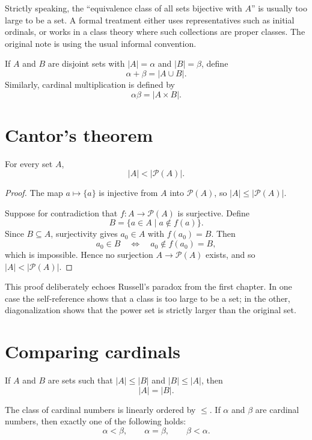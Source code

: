 \begin{caution}
Strictly speaking, the ``equivalence class of all sets bijective with \(A\)'' is usually too large to be a set.  A formal treatment either uses representatives such as initial ordinals, or works in a class theory where such collections are proper classes.  The original note is using the usual informal convention.
\end{caution}

If \(A\) and \(B\) are disjoint sets with \(|A|=\alpha\) and \(|B|=\beta\), define
\[
  \alpha+\beta=|A\cup B|.
\]
Similarly, cardinal multiplication is defined by
\[
  \alpha\beta=|A\times B|.
\]

\section{Cantor's theorem}

\begin{theorem}[Cantor]
For every set \(A\),
\[
  |A|<|\mathcal P(A)|.
\]
\end{theorem}

\begin{proof}
The map \(a\mapsto\{a\}\) is injective from \(A\) into \(\mathcal P(A)\), so \(|A|\le |\mathcal P(A)|\).

Suppose for contradiction that \(f:A\to\mathcal P(A)\) is surjective.  Define
\[
  B=\{a\in A\mid a\notin f(a)\}.
\]
Since \(B\subseteq A\), surjectivity gives \(a_0\in A\) with \(f(a_0)=B\).  Then
\[
  a_0\in B \quad\Longleftrightarrow\quad a_0\notin f(a_0)=B,
\]
which is impossible.  Hence no surjection \(A\to\mathcal P(A)\) exists, and so \(|A|<|\mathcal P(A)|\).
\end{proof}

This proof deliberately echoes Russell's paradox from the first chapter.  In one case the self-reference shows that a class is too large to be a set; in the other, diagonalization shows that the power set is strictly larger than the original set.

\section{Comparing cardinals}

\begin{theorem}
If \(A\) and \(B\) are sets such that \(|A|\le |B|\) and \(|B|\le |A|\), then
\[
  |A|=|B|.
\]
\end{theorem}

\begin{theorem}
The class of cardinal numbers is linearly ordered by \(\le\).  If \(\alpha\) and \(\beta\) are cardinal numbers, then exactly one of the following holds:
\[
  \alpha<\beta,\qquad \alpha=\beta,\qquad \beta<\alpha.
\]
\end{theorem}

